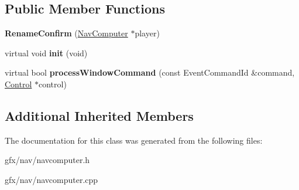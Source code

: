 \subsection*{Public Member Functions}
\begin{DoxyCompactItemize}
\item 
{\bfseries Rename\+Confirm} (\hyperlink{classNavComputer}{Nav\+Computer} $\ast$player)\hypertarget{classNavComputer_1_1RenameConfirm_a774d983c5eeb930ace0e040444968849}{}\label{classNavComputer_1_1RenameConfirm_a774d983c5eeb930ace0e040444968849}

\item 
virtual void {\bfseries init} (void)\hypertarget{classNavComputer_1_1RenameConfirm_affe655eb5e5b6630eff6007cd5a27e1b}{}\label{classNavComputer_1_1RenameConfirm_affe655eb5e5b6630eff6007cd5a27e1b}

\item 
virtual bool {\bfseries process\+Window\+Command} (const Event\+Command\+Id \&command, \hyperlink{classControl}{Control} $\ast$control)\hypertarget{classNavComputer_1_1RenameConfirm_aa975956a794ae19a94699a4d000ddd22}{}\label{classNavComputer_1_1RenameConfirm_aa975956a794ae19a94699a4d000ddd22}

\end{DoxyCompactItemize}
\subsection*{Additional Inherited Members}


The documentation for this class was generated from the following files\+:\begin{DoxyCompactItemize}
\item 
gfx/nav/navcomputer.\+h\item 
gfx/nav/navcomputer.\+cpp\end{DoxyCompactItemize}
